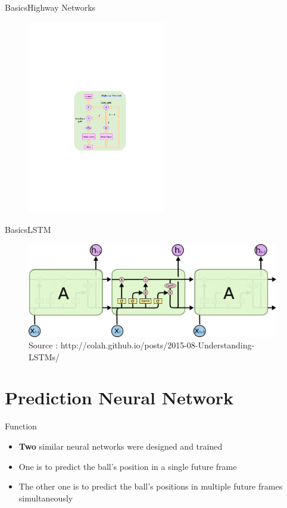 \documentclass{beamer}
\newcommand{\source}[1]{\caption*{{\color{blue}Source :} {#1}} }
\begin{document}
	\begin{frame}{Basics}{Highway Networks}
	\begin{figure}
	\includegraphics[width=6cm]{highway.pdf}
	\end{figure}
	\end{frame}
	
	\begin{frame}{Basics}{LSTM}
	\begin{figure}
	\includegraphics[width=11cm]{LSTM.png}
	\caption{LSTM}
	\source{http://colah.github.io/posts/2015-08-Understanding-LSTMs/}
	\end{figure}
	\end{frame}
	
	\section{Prediction Neural Network}
	
	\begin{frame}{Function}
	\begin{itemize}
	\item {\textbf{Two} similar neural networks were designed and trained}
	\item {One is to predict the ball's position in a {\color{magenta}single} future frame}
	\item {The other one is to predict the ball's positions in {\color{magenta}multiple} future frames simultaneously}
	\end{itemize}
	\end{frame}
	
\end{document}
